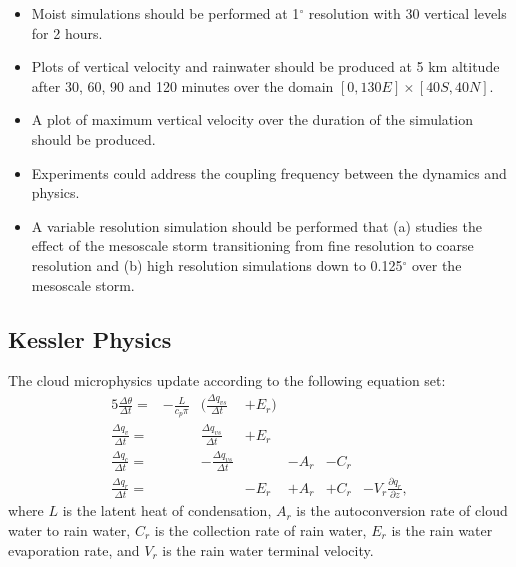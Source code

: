 \documentclass[times,doublespace]{fldauth}
\newcommand{\pdiff}[2]{\frac{\partial #1}{\partial #2}}
\begin{document}
{\begin{itemize}
\item Moist simulations should be performed at 1$^\circ$ resolution with 30 vertical levels for 2 hours.
\item Plots of vertical velocity and rainwater should be produced at 5 km altitude after 30, 60, 90 and 120 minutes over the domain $[0, 130E] \times [40S, 40N]$.
\item A plot of maximum vertical velocity over the duration of the simulation should be produced.
\item Experiments could address the coupling frequency between the dynamics and physics.
\item A variable resolution simulation should be performed that (a) studies the effect of the mesoscale storm transitioning from fine resolution to coarse resolution and (b) high resolution simulations down to 0.125$^\circ$ over the mesoscale storm.
\end{itemize}







\begin{appendix}


\section{Kessler Physics} \label{sec:KesslerPhysics}

The cloud microphysics update according to the following equation set:
\begin{alignat}{5}
\frac{\Delta \theta}{\Delta t} = & - \frac{L}{c_p \pi} & \Big( \frac{\Delta q_{vs}}{\Delta t} & + E_r  \Big) & \\
\frac{\Delta q_v}{\Delta t} = & & \frac{\Delta q_{vs}}{\Delta t} & + E_r \\
\frac{\Delta q_c}{\Delta t} = & & - \frac{\Delta q_{vs}}{\Delta t} & & - A_r & - C_r \\
\frac{\Delta q_r}{\Delta t} = & & & - E_r & + A_r & + C_r & - V_r \pdiff{q_r}{z},
\end{alignat} where $L$ is the latent heat of condensation, $A_r$ is the autoconversion rate of cloud water to rain water, $C_r$ is the collection rate of rain water, $E_r$ is the rain water evaporation rate, and $V_r$ is the rain water terminal velocity.


\end{appendix}}
\end{document}
